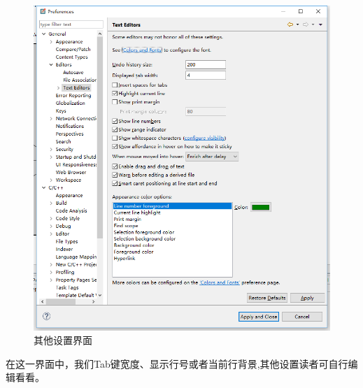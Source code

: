 \begin{figure}
	\centering
	\includegraphics[width=\textwidth]{../img/chapter3/picture3-3-2.png}
	\caption{其他设置界面}\label{fig:1a}		
\end{figure}

在这一界面中，我们Tab键宽度、显示行号或者当前行背景,其他设置读者可自行编辑看看。








